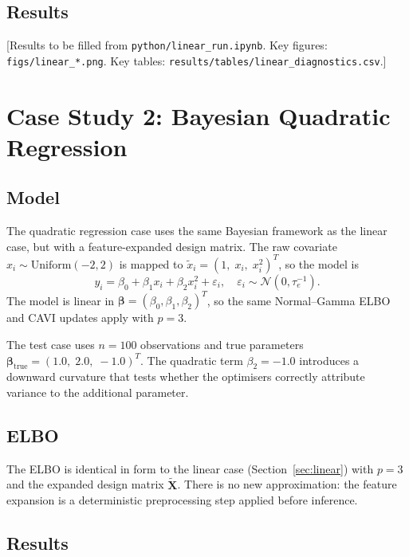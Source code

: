 \documentclass[11pt,a4paper]{article}
\newcommand{\N}{\mathcal{N}}
\begin{document}
\subsection{Results}

[Results to be filled from \texttt{python/linear\_run.ipynb}.
Key figures: \texttt{figs/linear\_*.png}.
Key tables: \texttt{results/tables/linear\_diagnostics.csv}.]

\section{Case Study 2: Bayesian Quadratic Regression}
\label{sec:quadratic}

\subsection{Model}

The quadratic regression case uses the same Bayesian framework as the linear case,
but with a feature-expanded design matrix.
The raw covariate $x_i \sim \mathrm{Uniform}(-2,2)$ is mapped to
$\tilde{x}_i = (1,\; x_i,\; x_i^2)^T$, so the model is
\begin{equation}
  y_i = \beta_0 + \beta_1 x_i + \beta_2 x_i^2 + \varepsilon_i,
  \quad \varepsilon_i \sim \N(0, \tau_e^{-1}).
\end{equation}
The model is linear in $\bm{\beta} = (\beta_0, \beta_1, \beta_2)^T$, so the same
Normal--Gamma ELBO and CAVI updates apply with $p=3$.

The test case uses $n=100$ observations and true parameters
$\bm{\beta}_{\mathrm{true}} = (1.0,\; 2.0,\; -1.0)^T$.
The quadratic term $\beta_2 = -1.0$ introduces a downward curvature that tests whether
the optimisers correctly attribute variance to the additional parameter.

\subsection{ELBO}

The ELBO is identical in form to the linear case (Section~\ref{sec:linear}) with
$p=3$ and the expanded design matrix $\tilde{\bm{X}}$.
There is no new approximation: the feature expansion is a deterministic preprocessing
step applied before inference.

\subsection{Results}
\end{document}

